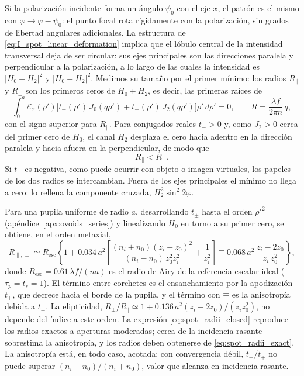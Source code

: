Si la polarización incidente forma un ángulo $\psi_0$ con el eje $x$, el
patrón es el mismo con $\varphi\to\varphi-\psi_0$: el punto focal rota
rígidamente con la polarización, sin grados de libertad angulares adicionales.
La estructura de \eqref{eq:I_spot_linear_deformation} implica que el lóbulo
central de la intensidad transversal deja de ser circular: sus ejes
principales son las direcciones paralela y perpendicular a la polarización, a
lo largo de las cuales la intensidad es $|H_0-H_2|^2$ y $|H_0+H_2|^2$. Medimos
su tamaño por el primer mínimo: los radios $R_\parallel$ y $R_\perp$ son los
primeros ceros de $H_0\mp H_2$, es decir, las primeras raíces de
\begin{equation}
  \int_0^a \mathscr E_x(\rho')\bigl[t_+(\rho')\,J_0(q\rho')\mp t_-(\rho')\,J_2(q\rho')\bigr]\rho'\,d\rho'=0,
  \qquad
  R=\frac{\lambda f}{2\pi n}\,q,
\label{eq:spot_radii_exact}
\end{equation}
con el signo superior para $R_\parallel$. Para conjugados reales $t_->0$ y,
como $J_2>0$ cerca del primer cero de $H_0$, el canal $H_2$ desplaza el cero
hacia adentro en la dirección paralela y hacia afuera en la perpendicular, de
modo que
\begin{equation}
  R_\parallel < R_\perp .
\label{eq:spot_radii_ordering}
\end{equation}
Si $t_-$ es negativa, como puede ocurrir con objeto o imagen virtuales, los
papeles de los dos radios se intercambian.
Fuera de los ejes principales el mínimo no llega a cero: lo rellena la
componente cruzada, $H_2^2\sin^2 2\varphi$.

Para una pupila uniforme de radio $a$, desarrollando $t_\pm$ hasta el orden
$\rho'^2$ (apéndice~\ref{apx:ovoids_series}) y linealizando $H_0$ en torno a su
primer cero, se obtiene, en el orden metaxial,
\begin{equation}
  R_{\parallel,\perp}
  \simeq
  R_{\mathrm{esc}}
  \left\{
  1
  +0.034\,a^2\left[\frac{(n_i+n_0)(z_i-z_0)^2}{(n_i-n_0)\,z_0^2z_i^2}+\frac{1}{z_i^2}\right]
  \mp 0.068\,a^2\,\frac{z_i-2z_0}{z_i\,z_0^2}
  \right\},
\label{eq:spot_radii_closed}
\end{equation}
donde $R_{\mathrm{esc}}=0.61\,\lambda f/(na)$ es el radio de Airy de la
referencia escalar ideal ($\tau_p=t_s=1$). El término entre corchetes es el
ensanchamiento por la apodización $t_+$, que decrece hacia el borde de la
pupila, y el término con $\mp$ es la anisotropía debida a $t_-$. La
elipticidad, $R_\perp/R_\parallel\simeq 1+0.136\,a^2(z_i-2z_0)/(z_iz_0^2)$, no
depende del índice a este orden. La expresión \eqref{eq:spot_radii_closed}
reproduce los radios exactos a aperturas moderadas; cerca de la incidencia
rasante sobrestima la anisotropía, y los radios deben obtenerse de
\eqref{eq:spot_radii_exact}. La anisotropía está, en todo caso, acotada: con
convergencia débil, $t_-/t_+$ no puede superar $(n_i-n_0)/(n_i+n_0)$, valor
que alcanza en incidencia rasante.

